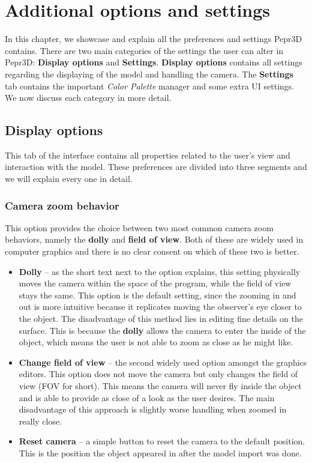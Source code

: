 \chapter{Additional options and settings}

In this chapter, we showcase and explain all the preferences and settings Pepr3D contains. There are two main categories of the settings the user can alter in Pepr3D: \textbf{Display options} and \textbf{Settings}. \textbf{Display options} contains all settings regarding the displaying of the model and handling the camera. The \textbf{Settings} tab contains the important \textit{Color Palette} manager and some extra UI settings. We now discuss each category in more detail.

\section{Display options}

This tab of the interface contains all properties related to the user's view and interaction with the model. These preferences are divided into three segments and we will explain every one in detail.

\subsection{Camera zoom behavior}

This option provides the choice between two most common camera zoom behaviors, namely the \textbf{dolly} and \textbf{field of view}. Both of these are widely used in computer graphics and there is no clear consent on which of these two is better.

\begin{itemize}
\item \textbf{Dolly} -- as the short text next to the option explains, this setting physically moves the camera within the space of the program, while the field of view stays the same. This option is the default setting, since the zooming in and out is more intuitive because it replicates moving the observer's eye closer to the object. The disadvantage of this method lies in editing fine details on the surface. This is because the \textbf{dolly} allows the camera to enter the inside of the object, which means the user is not able to zoom as close as he might like.

\item \textbf{Change field of view} -- the second widely used option amongst the graphics editors. This option does not move the camera but only changes the field of view (FOV for short). This means the camera will never fly inside the object and is able to provide as close of a look as the user desires. The main disadvantage of this approach is slightly worse handling when zoomed in really close.

\item \textbf{Reset camera} -- a simple button to reset the camera to the default position. This is the position the object appeared in after the model import was done.

\end{itemize}


